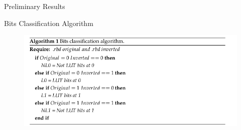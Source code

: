 \documentclass[aspectratio=1610]{beamer}
\newcommand{\semitransp}[2][35]{\color{fg!#1}#2}
\begin{document}
\begin{frame}{Preliminary Results}

\begin{block}{Bits Classification Algorithm}
\end{block}




\begin{figure}[tb!]
 \centering
  \captionsetup{justification=centering}    
   \includegraphics[scale=0.5]{Figures/algo-1.png}
   
\end{figure}






\end{frame}



\end{document}
